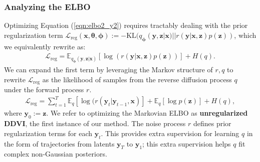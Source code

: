 \documentclass[letterpaper]{article} %
\newcommand{\bx}{\mathbf{x}}
\newcommand{\bz}{\mathbf{z}}
\newcommand{\by}{\mathbf{y}}
\newcommand\Exp{\mathbb{E}}
\newcommand\KL{\text{KL}}
\newcommand\Lc{\mathcal{L}}
\let\oldtheta\theta
\renewcommand{\theta}{{\boldsymbol \oldtheta}}
\let\oldphi\phi
\renewcommand{\phi}{{\boldsymbol \oldphi}}
\begin{document}
\subsubsection{Analyzing the ELBO}
Optimizing Equation (\ref{eqn:elbo2_y2}) requires tractably dealing with the prior regularization term $\mathcal{L}_\text{reg}(\bx,\theta,\phi) := -\KL(q_\phi(\by,\bz|\bx)||r(\by|\bx,\bz)p(\bz))$, which we equivalently rewrite as:
\begin{align}
\mathcal{L}_\text{reg} = \Exp_{q_\phi(\by,\bz|\bx)}[\log(r(\by|\bx,\bz)p(\bz))] + H(q). \label{eqn:reg_loss}
\end{align}
We can expand the first term by leveraging the Markov structure of  $r, q$ to rewrite $\mathcal{L}_\text{reg}$ as the likelihood of samples from the reverse diffusion process $q$ under the forward process $r$.
\begin{align}
\mathcal{L}_\text{reg} = \sum_{t=1}^T \Exp_{q}[\log(r(\by_t|\by_{t-1},\bx)] + \Exp_{q} [\log p(\bz)] + H(q), \nonumber
\end{align}
where $\by_0 := \bz$. We refer to optimizing the Markovian ELBO as \textbf{unregularized DDVI}, the first instance of our method. 
The noise process $r$ defines prior regularization terms for each $\by_t$. This provides extra supervision for learning $q$ in the form of trajectories from latents $\by_T$ to $\by_1$; this extra supervision helps $q$ fit complex non-Gaussian posteriors.
\end{document}
